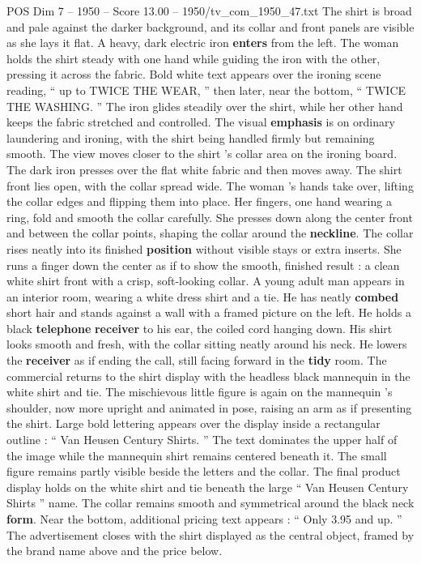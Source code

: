 \begin{textsample}{POS Dim 7 – 1950 – Score 13.00 – 1950/tv\_com\_1950\_47.txt}
The shirt is broad and pale against the darker background, and its collar and front panels are visible as she lays it flat.
A heavy, dark electric iron \textbf{enters} from the left.
The woman holds the shirt steady with one hand while guiding the iron with the other, pressing it across the fabric.
Bold white text appears over the ironing scene reading, “ up to TWICE THE WEAR, ” then later, near the bottom, “ TWICE THE WASHING. ” The iron glides steadily over the shirt, while her other hand keeps the fabric stretched and controlled.
The visual \textbf{emphasis} is on ordinary laundering and ironing, with the shirt being handled firmly but remaining smooth.
The view moves closer to the shirt ’s collar area on the ironing board.
The dark iron presses over the flat white fabric and then moves away.
The shirt front lies open, with the collar spread wide.
The woman ’s hands take over, lifting the collar edges and flipping them into place.
Her fingers, one hand wearing a ring, fold and smooth the collar carefully.
She presses down along the center front and between the collar points, shaping the collar around the \textbf{neckline}.
The collar rises neatly into its finished \textbf{position} without visible stays or extra inserts.
She runs a finger down the center as if to show the smooth, finished result : a clean white shirt front with a crisp, soft-looking collar.
A young adult man appears in an interior room, wearing a white dress shirt and a tie.
He has neatly \textbf{combed} short hair and stands against a wall with a framed picture on the left.
He holds a black \textbf{telephone} \textbf{receiver} to his ear, the coiled cord hanging down.
His shirt looks smooth and fresh, with the collar sitting neatly around his neck.
He lowers the \textbf{receiver} as if ending the call, still facing forward in the \textbf{tidy} room.
The commercial returns to the shirt display with the headless black mannequin in the white shirt and tie.
The mischievous little figure is again on the mannequin ’s shoulder, now more upright and animated in pose, raising an arm as if presenting the shirt.
Large bold lettering appears over the display inside a rectangular outline : “ Van Heusen Century Shirts. ” The text dominates the upper half of the image while the mannequin shirt remains centered beneath it.
The small figure remains partly visible beside the letters and the collar.
The final product display holds on the white shirt and tie beneath the large “ Van Heusen Century Shirts ” name.
The collar remains smooth and symmetrical around the black neck \textbf{form}.
Near the bottom, additional pricing text appears : “ Only 3.95 and up. ” The advertisement closes with the shirt displayed as the central object, framed by the brand name above and the price below.

\end{textsample}
